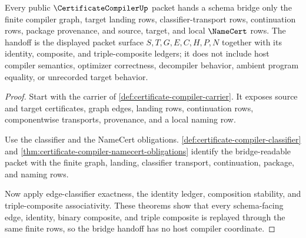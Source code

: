 \begin{theorem}
\label{thm:certificate-compiler-bridge-schema-handoff}
Every public $\CertificateCompilerUp$ packet hands a schema bridge only the finite compiler graph, target landing rows, classifier-transport rows, continuation rows, package provenance, and source, target, and local $\NameCert$ rows. The handoff is the displayed packet surface $S,T,G,E,C,H,P,N$ together with its identity, composite, and triple-composite ledgers; it does not include host compiler semantics, optimizer correctness, decompiler behavior, ambient program equality, or unrecorded target behavior.
\end{theorem}
\begin{proof}
Start with the carrier of \autoref{def:certificate-compiler-carrier}. It exposes source and target certificates, graph edges, landing rows, continuation rows, componentwise transports, provenance, and a local naming row.

Use the classifier and the NameCert obligations. \autoref{def:certificate-compiler-classifier} and \autoref{thm:certificate-compiler-namecert-obligations} identify the bridge-readable packet with the finite graph, landing, classifier transport, continuation, package, and naming rows.

Now apply edge-classifier exactness, the identity ledger, composition stability, and triple-composite associativity. These theorems show that every schema-facing edge, identity, binary composite, and triple composite is replayed through the same finite rows, so the bridge handoff has no host compiler coordinate.
\end{proof}

